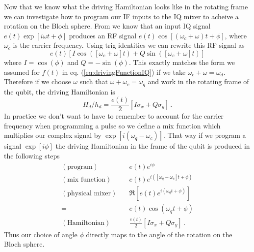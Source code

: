 Now that we know what the driving Hamiltonian looks like in the rotating frame we can investigate how to program our IF inputs to the IQ mixer to acheive a rotation on the Bloch sphere.
From  we know that an input IQ signal $e(t)\exp\left[i\omega t + \phi\right]$ produces an RF signal $ e(t)\cos\left[(\omega_c+\omega)t + \phi \right]$, where $\omega_c$ is the carrier frequency.
Using trig identities we can rewrite this RF signal as
\begin{equation}
  e(t)
  \left[
      I \cos(\left[\omega_c + \omega \right] t)
    + Q \sin(\left[\omega_c + \omega \right] t)
  \right]
  \nonumber
\end{equation}
where $I=\cos(\phi)$ and $Q=-\sin(\phi)$.
This exactly matches the form we assumed for $f(t)$ in eq. (\ref{eq:drivingFunctionIQ}) if we take $\omega_c + \omega = \omega_d$.
Therefore if we choose $\omega$ such that $\omega + \omega_c = \omega_q$ and work in the rotating frame of the qubit, the driving Hamiltonian is
\begin{equation}
  H_d/h_d = \frac{e(t)}{2}\left[I\sigma_x + Q\sigma_y\right] \, .
\end{equation}
In practice we don't want to have to remember to account for the carrier frequency when programming a pulse so we define a mix function which multiplies our complex signal by $\exp\left[i(\omega_{q} - \omega_c)\right]$.
That way if we program a signal $\exp\left[i\phi\right]$ the driving Hamiltonian in the frame of the qubit is produced in the following steps
\begin{align*}
  (\text{program}) \quad & e(t) e^{i\phi} \\
  (\text{mix function}) \quad & e(t) e^{i([\omega_q-\omega_c]t + \phi)} \\
  (\text{physical mixer}) \quad & \Re \left[ e(t) e^{i(\omega_q t + \phi)} \right] \\
  = & e(t) \cos\left(\omega_q t + \phi \right) \\
  (\text{Hamiltonian}) \quad & \frac{e(t)}{2}\left[ I \sigma_x + Q \sigma_y \right] \, .
\end{align*}
Thus our choice of angle $\phi$ directly maps to the angle of the rotation on the Bloch sphere.



